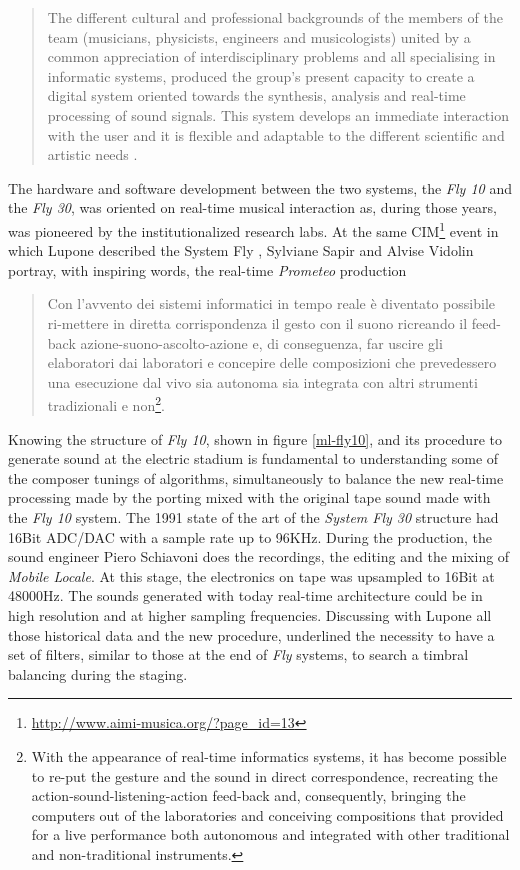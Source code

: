 \documentclass[twoside,a4paper]{article}
\begin{document}
\begin{quote}
The different cultural and professional backgrounds of the members of the team (musicians, physicists, engineers and musicologists) united by a common appreciation of interdisciplinary problems and all specialising in informatic systems, produced the group's present capacity to create a digital system oriented towards the synthesis, analysis and real-time processing of sound signals. This system develops an immediate interaction with the user and it is flexible and adaptable to the different scientific and artistic needs \cite{ml91}.
\end{quote}

The hardware and software development between the two systems, the \emph{Fly 10} and the \emph{Fly 30}, was oriented on real-time musical interaction as, during those years, was pioneered by the institutionalized research labs. At the same CIM\footnote{\url{http://www.aimi-musica.org/?page_id=13}} event in which Lupone described the System Fly \cite{ml85},  Sylviane Sapir and Alvise Vidolin \cite{savi85} portray, with inspiring words, the real-time \emph{Prometeo} production

\begin{quote}
Con l'avvento dei sistemi informatici in tempo reale è diventato possibile ri-mettere in diretta corrispondenza il gesto con il suono ricreando il feed-back azione-suono-ascolto-azione e, di conseguenza, far uscire gli elaboratori dai laboratori e concepire delle composizioni che prevedessero una esecuzione dal vivo sia autonoma sia integrata con altri strumenti tradizionali e non\footnote{With the appearance of real-time informatics systems, it has become possible to re-put the gesture and the sound in direct correspondence, recreating the action-sound-listening-action feed-back and, consequently, bringing the computers out of the laboratories and conceiving compositions that provided for a live performance both autonomous and integrated with other traditional and non-traditional instruments.}. 
\end{quote}

Knowing the structure of \emph{Fly 10}, shown in figure \ref{ml-fly10}, and its procedure to generate sound at the electric stadium is fundamental to understanding some of the composer tunings of algorithms,  simultaneously to balance the new real-time processing made by the porting mixed with the original tape sound made with the \emph{Fly 10} system. The 1991 state of the art of the \emph{System Fly 30} structure had 16Bit ADC/DAC with a sample rate up to 96KHz. During the production, the sound engineer Piero Schiavoni does the recordings, the editing and the mixing of \emph{Mobile Locale}. At this stage, the electronics on tape was upsampled to 16Bit at 48000Hz. The sounds generated with today real-time architecture could be in high resolution and at higher sampling frequencies. Discussing with Lupone all those historical data and the new procedure, underlined the necessity to have a set of filters, similar to those at the end of \emph{Fly} systems, to search a timbral balancing during the staging. 
\end{document}
